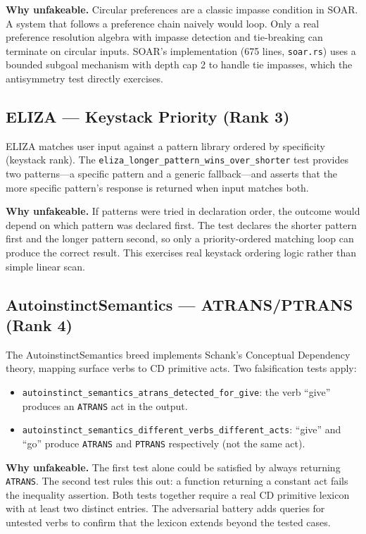 \textbf{Why unfakeable.} Circular preferences are a classic impasse condition in SOAR. A
system that follows a preference chain naively would loop. Only a real preference resolution
algebra with impasse detection and tie-breaking can terminate on circular inputs. SOAR's
implementation (675 lines, \texttt{soar.rs}) uses a bounded subgoal mechanism with depth cap
2 to handle tie impasses, which the antisymmetry test directly exercises.

\subsection{ELIZA --- Keystack Priority (Rank 3)}
\label{subsec:eliza-oracle}

ELIZA matches user input against a pattern library ordered by specificity (keystack rank).
The \texttt{eliza\_longer\_pattern\_wins\_over\_shorter} test provides two patterns---a
specific pattern and a generic fallback---and asserts that the more specific pattern's response
is returned when input matches both.

\textbf{Why unfakeable.} If patterns were tried in declaration order, the outcome would depend
on which pattern was declared first. The test declares the shorter pattern first and the longer
pattern second, so only a priority-ordered matching loop can produce the correct result. This
exercises real keystack ordering logic rather than simple linear scan.

\subsection{AutoinstinctSemantics --- ATRANS/PTRANS (Rank 4)}
\label{subsec:autoinstinct-semantics-oracle}

The AutoinstinctSemantics breed implements Schank's Conceptual Dependency theory, mapping
surface verbs to CD primitive acts. Two falsification tests apply:

\begin{itemize}
  \item \texttt{autoinstinct\_semantics\_atrans\_detected\_for\_give}: the verb ``give''
    produces an \texttt{ATRANS} act in the output.
  \item \texttt{autoinstinct\_semantics\_different\_verbs\_different\_acts}: ``give'' and
    ``go'' produce \texttt{ATRANS} and \texttt{PTRANS} respectively (not the same act).
\end{itemize}

\textbf{Why unfakeable.} The first test alone could be satisfied by always returning
\texttt{ATRANS}. The second test rules this out: a function returning a constant act fails the
inequality assertion. Both tests together require a real CD primitive lexicon with at least
two distinct entries. The adversarial battery adds queries for untested verbs to confirm that
the lexicon extends beyond the tested cases.

